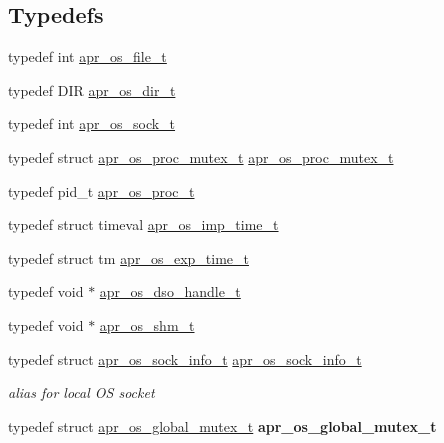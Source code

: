 \subsection*{Typedefs}
\begin{DoxyCompactItemize}
\item 
typedef int \mbox{\hyperlink{group__apr__portabile_ga885491b889a4a719549650d3a370fd34}{apr\+\_\+os\+\_\+file\+\_\+t}}
\item 
typedef D\+IR \mbox{\hyperlink{group__apr__portabile_gacb790646cfc3da1b43a5f7c4bfaa3937}{apr\+\_\+os\+\_\+dir\+\_\+t}}
\item 
typedef int \mbox{\hyperlink{group__apr__portabile_ga2965cd2e48cb6513bc0ba05aa6083ed7}{apr\+\_\+os\+\_\+sock\+\_\+t}}
\item 
typedef struct \mbox{\hyperlink{structapr__os__proc__mutex__t}{apr\+\_\+os\+\_\+proc\+\_\+mutex\+\_\+t}} \mbox{\hyperlink{group__apr__portabile_ga107413a26e947456cabfcab99b8a7ade}{apr\+\_\+os\+\_\+proc\+\_\+mutex\+\_\+t}}
\item 
typedef pid\+\_\+t \mbox{\hyperlink{group__apr__portabile_ga2ce5962de629ee6528081813c6b60e2e}{apr\+\_\+os\+\_\+proc\+\_\+t}}
\item 
typedef struct timeval \mbox{\hyperlink{group__apr__portabile_ga6d27e476300cd1d3fda24e1ff0e358e1}{apr\+\_\+os\+\_\+imp\+\_\+time\+\_\+t}}
\item 
typedef struct tm \mbox{\hyperlink{group__apr__portabile_ga0fa9349212690591b09a0cbea7b61bdd}{apr\+\_\+os\+\_\+exp\+\_\+time\+\_\+t}}
\item 
typedef void $\ast$ \mbox{\hyperlink{group__apr__portabile_ga542684803ee8ab0abd69077697599ec0}{apr\+\_\+os\+\_\+dso\+\_\+handle\+\_\+t}}
\item 
typedef void $\ast$ \mbox{\hyperlink{group__apr__portabile_ga7af1085d6390fbd08d66482b8c17de51}{apr\+\_\+os\+\_\+shm\+\_\+t}}
\item 
\mbox{\label{group__apr__portabile_gaece2b8b41cbb949590896b47daaa9fd2}} 
typedef struct \mbox{\hyperlink{structapr__os__sock__info__t}{apr\+\_\+os\+\_\+sock\+\_\+info\+\_\+t}} \mbox{\hyperlink{group__apr__portabile_gaece2b8b41cbb949590896b47daaa9fd2}{apr\+\_\+os\+\_\+sock\+\_\+info\+\_\+t}}
\begin{DoxyCompactList}\small\item\em alias for local OS socket \end{DoxyCompactList}\item 
\mbox{\label{group__apr__portabile_gadf7b676b7a604bbaa2bc9c4257b05682}} 
typedef struct \mbox{\hyperlink{structapr__os__global__mutex__t}{apr\+\_\+os\+\_\+global\+\_\+mutex\+\_\+t}} {\bfseries apr\+\_\+os\+\_\+global\+\_\+mutex\+\_\+t}
\end{DoxyCompactItemize}
